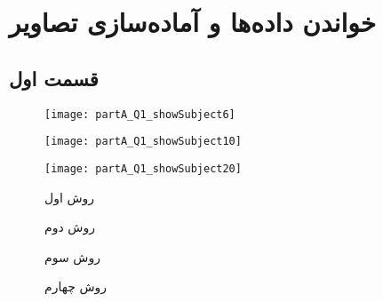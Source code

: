 \chapter{خواندن داده‌ها و آماده‌سازی تصاویر}

\ptext[1]

\section{قسمت اول}


\ptext[2-3]
\cite{fieldtrip-prepare_mesh_segmentation.m}

\begin{figure}[t!]
	\centering
	\removevspace
	\caption{}
	\label{fig:partA:Q1:showAtlas}
\end{figure}

\begin{figure}
	\centering
	\texttt{[image: partA\_Q1\_showSubject6]}
	\caption{}
	\label{fig:partaq1showsubject6}
\end{figure}
\begin{figure}
	\centering
	\texttt{[image: partA\_Q1\_showSubject10]}
	\caption{}
	\label{fig:partaq1showsubject10}
\end{figure}
\begin{figure}
	\centering
	\texttt{[image: partA\_Q1\_showSubject20]}
	\caption{}
	\label{fig:partaq1showsubject20}
\end{figure}




\begin{figure}[t!]
	\centering
	\removevspace
	\caption{روش اول}
	\label{fig:partA:Q2:method1-isosurface}
\end{figure}

\begin{figure}[t!]
	\centering
	\removevspace
	\caption{روش دوم}
	\label{fig:partA:Q2:method2-isosurface}
\end{figure}



\begin{figure}[t!]
	\centering
	\removevspace
	\caption{روش سوم}
	\label{fig:partA:Q2:method3-bwperim3}
\end{figure}


\begin{figure}[t!]
	\centering
	\removevspace
	\caption{روش چهارم}
	\label{fig:partA:Q2:method4-iso2mesh}
\end{figure}














